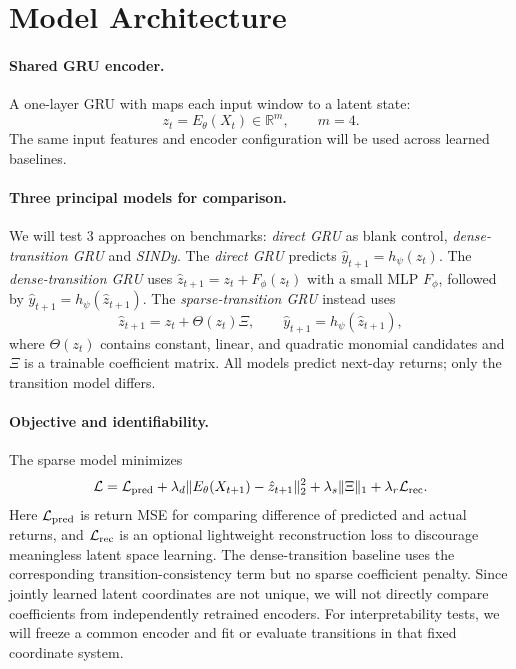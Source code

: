 \documentclass{article}
\begin{document}
\section{Model Architecture}
\paragraph{Shared GRU encoder.}
A one-layer GRU with maps each input window to a latent state:
\begin{equation}
z_t=E_\theta(X_t)\in\mathbb{R}^{m},\qquad m=4.
\end{equation}
The same input features and encoder configuration will be used across learned baselines.

\paragraph{Three principal models for comparison.}
We will test 3 approaches on benchmarks: \emph{direct GRU} as blank control, \emph{dense-transition GRU} and \emph{SINDy}. The \emph{direct GRU} predicts $\hat y_{t+1}=h_\psi(z_t)$. The \emph{dense-transition GRU} uses
$\hat z_{t+1}=z_t+F_\phi(z_t)$ with a small MLP $F_\phi$, followed by $\hat y_{t+1}=h_\psi(\hat z_{t+1})$. The \emph{sparse-transition GRU} instead uses
\begin{equation}
\hat z_{t+1}=z_t+\Theta(z_t)\Xi,\qquad
\hat y_{t+1}=h_\psi(\hat z_{t+1}),
\end{equation}
where $\Theta(z_t)$ contains constant, linear, and quadratic monomial candidates and $\Xi$ is a trainable coefficient matrix. All models predict next-day returns; only the transition model differs.

\paragraph{Objective and identifiability.}
The sparse model minimizes
\begin{equation}
\mathcal L=\mathcal L_{\rm pred}
+\lambda_d\|E_\theta(X_{t+1})-\hat z_{t+1}\|_2^2
+\lambda_s\|\Xi\|_1
+\lambda_r\mathcal L_{\rm rec}.
\end{equation}
Here $\mathcal L_{\rm pred}$ is return MSE for comparing difference of predicted and actual returns, and $\mathcal L_{\rm rec}$ is an optional lightweight reconstruction loss to discourage meaningless latent space learning. The dense-transition baseline uses the corresponding transition-consistency term but no sparse coefficient penalty. Since jointly learned latent coordinates are not unique, we will not directly compare coefficients from independently retrained encoders. For interpretability tests, we will freeze a common encoder and fit or evaluate transitions in that fixed coordinate system.
\end{document}
